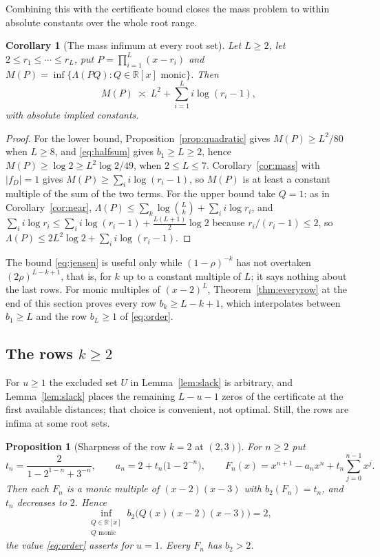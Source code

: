 \documentclass[11pt]{article}
\newtheorem{corollary}[theorem]{Corollary}
\newtheorem{proposition}[theorem]{Proposition}
\newcommand{\R}{\mathbb R}
\begin{document}
Combining this with the certificate bound closes the mass problem to within
absolute constants over the whole root range.

\begin{corollary}[The mass infimum at every root set]\label{cor:allroots}
Let $L\ge2$, let $2\le r_1\le\cdots\le r_L$, put $P=\prod_{i=1}^L(x-r_i)$ and
$M(P)=\inf\{\Lambda(PQ):Q\in\R[x]\text{ monic}\}$.  Then
\[
  M(P)\ \asymp\ L^2+\sum_{i=1}^Li\log(r_i-1),
\]
with absolute implied constants.
\end{corollary}

\begin{proof}
For the lower bound, Proposition~\ref{prop:quadratic} gives
$M(P)\ge L^2/80$ when $L\ge8$, and \eqref{eq:halfsum} gives
$b_1\ge L\ge2$, hence $M(P)\ge\log2\ge L^2\log2/49$, when $2\le L\le7$.
Corollary~\ref{cor:mass} with $|f_D|=1$ gives
$M(P)\ge\sum_ii\log(r_i-1)$, so $M(P)$ is at least a constant multiple of
the sum of the two terms.
For the upper bound take $Q=1$: as in Corollary~\ref{cor:near},
$\Lambda(P)\le\sum_k\log\binom Lk+\sum_ii\log r_i$, and
$\sum_ii\log r_i\le\sum_ii\log(r_i-1)+\tfrac{L(L+1)}2\log2$ because
$r_i/(r_i-1)\le2$, so
$\Lambda(P)\le2L^2\log2+\sum_ii\log(r_i-1)$.
\end{proof}

The bound \eqref{eq:jensen} is useful only while $(1-\rho)^{-k}$ has not
overtaken $(2\rho)^{L-k+1}$, that is, for $k$ up to a constant multiple of
$L$; it says nothing about the last rows.  For monic multiples of $(x-2)^L$,
Theorem~\ref{thm:everyrow} at the end of this section proves every row
$b_k\ge L-k+1$, which interpolates between $b_1\ge L$ and the row $b_L\ge1$
of \eqref{eq:order}.

\subsection{The rows \texorpdfstring{$k\ge2$}{k at least 2}}

For $u\ge1$ the excluded set $U$ in Lemma~\ref{lem:slack} is arbitrary, and
Lemma~\ref{lem:slack} places the remaining $L-u-1$ zeros of the certificate
at the first available distances; that choice is convenient, not optimal.
Still, the rows are infima at some root sets.

\begin{proposition}[Sharpness of the row $k=2$ at $(2,3)$]
\label{prop:sharp23}
For $n\ge2$ put
\[
  t_n=\frac{2}{1-2^{1-n}+3^{-n}},
  \qquad a_n=2+t_n\bigl(1-2^{-n}\bigr),
  \qquad
  F_n(x)=x^{n+1}-a_nx^n+t_n\sum_{j=0}^{n-1}x^j .
\]
Then each $F_n$ is a monic multiple of $(x-2)(x-3)$ with $b_2(F_n)=t_n$, and
$t_n$ decreases to $2$.  Hence
\[
  \inf_{\substack{Q\in\R[x]\\ Q\text{ monic}}}
  b_2\bigl(Q(x)(x-2)(x-3)\bigr)=2,
\]
the value \eqref{eq:order} asserts for $u=1$.  Every $F_n$ has $b_2>2$.
\end{proposition}
\end{document}

